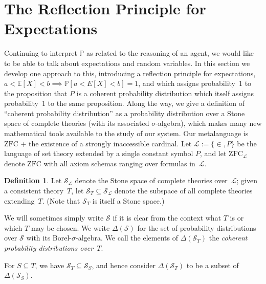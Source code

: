 \documentclass[12pt]{article}
\newcommand{\PP}{\mathbb{P}}
\newcommand{\EE}{\mathbb{E}}
\newcommand{\zfc}{\mathrm{ZFC}}
\newcommand{\zfcl}{{\zfc_\cL}}
\newcommand{\cSL}{{\cS_\cL}}
\newcommand{\cL}{\mathcal{L}}
\newcommand{\cS}{\mathcal{S}}
\theoremstyle{plain}
\theoremstyle{definition}
\newtheorem{definition}[theorem]{Definition}
\theoremstyle{remark}
\begin{document}
\section{The Reflection Principle for Expectations}
\label{refl-exp}
Continuing to interpret $\PP$ as related to the reasoning of an agent, we would like to be able to talk about expectations and random variables. In this section we develop one approach to this, introducing a reflection principle for expectations, $a < \EE[X] < b \implies \PP[a < E[X] < b] = 1$, and which assigns probability~1 to the proposition that $P$ is a coherent probability distribution which itself assigns probability~1 to the same proposition. 
Along the way, we give a definition of ``coherent probability distribution'' as a probability distribution over a Stone space of complete theories (with its associated $\sigma$-algebra), which makes many new mathematical tools available to the study of our system.
Our metalanguage is $\zfc$ + the existence of a strongly inaccessible cardinal.
Let $\cL := \{\in,P\}$ be the language of set theory extended by a single constant symbol $P$, and let $\zfcl$ denote $\zfc$ with all axiom schemas ranging over formulas in~$\cL$.
\begin{definition}
Let $\cSL$ denote the Stone space of complete theories over~$\cL$; given a consistent theory~$T$, let $\cS_T\subseteq\cSL$ denote the subspace of all complete theories extending~$T$. (Note that $\cS_T$ is itself a Stone space.) 

We will sometimes simply write $\cS$ if it is clear from the context what $T$ is or which $T$ may be chosen.
We write $\Delta(\cS)$ for the set of probability distributions over $\cS$ with its Borel-$\sigma$-algebra. We call the elements of $\Delta(\cS_T)$ the \emph{coherent probability distributions over~$T$}.
\end{definition}
For $S\subseteq T$, we have $\cS_T\subseteq\cS_S$, and hence consider $\Delta(\cS_T)$ to be a subset of $\Delta(\cS_S)$.
\end{document}
